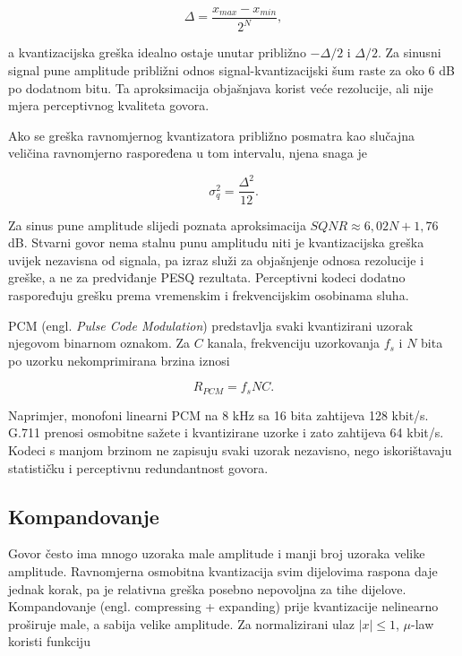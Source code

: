 \begin{equation}
\Delta=\frac{x_{max}-x_{min}}{2^N},
\end{equation}

a kvantizacijska greška idealno ostaje unutar približno $-\Delta/2$ i $\Delta/2$. Za sinusni signal pune amplitude približni odnos signal-kvantizacijski šum raste za oko 6 dB po dodatnom bitu. Ta aproksimacija objašnjava korist veće rezolucije, ali nije mjera perceptivnog kvaliteta govora.

Ako se greška ravnomjernog kvantizatora približno posmatra kao slučajna veličina ravnomjerno raspoređena u tom intervalu, njena snaga je

\begin{equation}
\sigma_q^2=\frac{\Delta^2}{12}.
\end{equation}

Za sinus pune amplitude slijedi poznata aproksimacija $SQNR\approx6{,}02N+1{,}76$ dB. Stvarni govor nema stalnu punu amplitudu niti je kvantizacijska greška uvijek nezavisna od signala, pa izraz služi za objašnjenje odnosa rezolucije i greške, a ne za predviđanje PESQ rezultata. Perceptivni kodeci dodatno raspoređuju grešku prema vremenskim i frekvencijskim osobinama sluha.

PCM (engl. \emph{Pulse Code Modulation}) predstavlja svaki kvantizirani uzorak njegovom binarnom oznakom. Za $C$ kanala, frekvenciju uzorkovanja $f_s$ i $N$ bita po uzorku nekomprimirana brzina iznosi

\begin{equation}
R_{PCM}=f_sNC.
\end{equation}

Naprimjer, monofoni linearni PCM na 8 kHz sa 16 bita zahtijeva 128 kbit/s. G.711 prenosi osmobitne sažete i kvantizirane uzorke i zato zahtijeva 64 kbit/s. Kodeci s manjom brzinom ne zapisuju svaki uzorak nezavisno, nego iskorištavaju statističku i perceptivnu redundantnost govora.

\subsection{Kompandovanje}

Govor često ima mnogo uzoraka male amplitude i manji broj uzoraka velike amplitude. Ravnomjerna osmobitna kvantizacija svim dijelovima raspona daje jednak korak, pa je relativna greška posebno nepovoljna za tihe dijelove. Kompandovanje (engl. compressing + expanding) prije kvantizacije nelinearno proširuje male, a sabija velike amplitude. Za normalizirani ulaz $|x|\leq1$, $\mu$-law koristi funkciju

